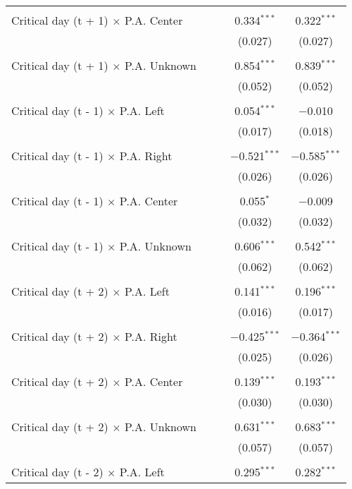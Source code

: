 \documentclass[
]{article}
\begin{document}
\begin{table}[!htbp]
{\begin{tabular}{@{\extracolsep{5pt}}lcccc}
  & & & & \\ 
 Critical day (t + 1) $\times$ P.A. Center &  &  & 0.334$^{***}$ & 0.322$^{***}$ \\ 
  &  &  & (0.027) & (0.027) \\ 
  & & & & \\ 
 Critical day (t + 1) $\times$ P.A. Unknown &  &  & 0.854$^{***}$ & 0.839$^{***}$ \\ 
  &  &  & (0.052) & (0.052) \\ 
  & & & & \\ 
 Critical day (t - 1) $\times$ P.A. Left &  &  & 0.054$^{***}$ & $-$0.010 \\ 
  &  &  & (0.017) & (0.018) \\ 
  & & & & \\ 
 Critical day (t - 1) $\times$ P.A. Right &  &  & $-$0.521$^{***}$ & $-$0.585$^{***}$ \\ 
  &  &  & (0.026) & (0.026) \\ 
  & & & & \\ 
 Critical day (t - 1) $\times$ P.A. Center &  &  & 0.055$^{*}$ & $-$0.009 \\ 
  &  &  & (0.032) & (0.032) \\ 
  & & & & \\ 
 Critical day (t - 1) $\times$ P.A. Unknown &  &  & 0.606$^{***}$ & 0.542$^{***}$ \\ 
  &  &  & (0.062) & (0.062) \\ 
  & & & & \\ 
 Critical day (t + 2) $\times$ P.A. Left &  &  & 0.141$^{***}$ & 0.196$^{***}$ \\ 
  &  &  & (0.016) & (0.017) \\ 
  & & & & \\ 
 Critical day (t + 2) $\times$ P.A. Right &  &  & $-$0.425$^{***}$ & $-$0.364$^{***}$ \\ 
  &  &  & (0.025) & (0.026) \\ 
  & & & & \\ 
 Critical day (t + 2) $\times$ P.A. Center &  &  & 0.139$^{***}$ & 0.193$^{***}$ \\ 
  &  &  & (0.030) & (0.030) \\ 
  & & & & \\ 
 Critical day (t + 2) $\times$ P.A. Unknown &  &  & 0.631$^{***}$ & 0.683$^{***}$ \\ 
  &  &  & (0.057) & (0.057) \\ 
  & & & & \\ 
 Critical day (t - 2) $\times$ P.A. Left &  &  & 0.295$^{***}$ & 0.282$^{***}$ \\ 

\end{tabular}}
\end{table}
\end{document}
